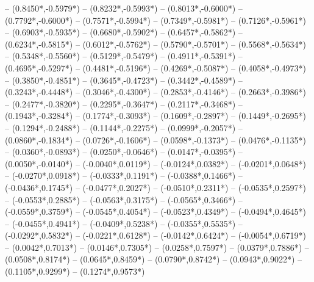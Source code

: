 {	-- ({0.8450*\dx},{-0.5979*\dy})
	-- ({0.8232*\dx},{-0.5993*\dy})
	-- ({0.8013*\dx},{-0.6000*\dy})
	-- ({0.7792*\dx},{-0.6000*\dy})
	-- ({0.7571*\dx},{-0.5994*\dy})
	-- ({0.7349*\dx},{-0.5981*\dy})
	-- ({0.7126*\dx},{-0.5961*\dy})
	-- ({0.6903*\dx},{-0.5935*\dy})
	-- ({0.6680*\dx},{-0.5902*\dy})
	-- ({0.6457*\dx},{-0.5862*\dy})
	-- ({0.6234*\dx},{-0.5815*\dy})
	-- ({0.6012*\dx},{-0.5762*\dy})
	-- ({0.5790*\dx},{-0.5701*\dy})
	-- ({0.5568*\dx},{-0.5634*\dy})
	-- ({0.5348*\dx},{-0.5560*\dy})
	-- ({0.5129*\dx},{-0.5479*\dy})
	-- ({0.4911*\dx},{-0.5391*\dy})
	-- ({0.4695*\dx},{-0.5297*\dy})
	-- ({0.4481*\dx},{-0.5196*\dy})
	-- ({0.4269*\dx},{-0.5087*\dy})
	-- ({0.4058*\dx},{-0.4973*\dy})
	-- ({0.3850*\dx},{-0.4851*\dy})
	-- ({0.3645*\dx},{-0.4723*\dy})
	-- ({0.3442*\dx},{-0.4589*\dy})
	-- ({0.3243*\dx},{-0.4448*\dy})
	-- ({0.3046*\dx},{-0.4300*\dy})
	-- ({0.2853*\dx},{-0.4146*\dy})
	-- ({0.2663*\dx},{-0.3986*\dy})
	-- ({0.2477*\dx},{-0.3820*\dy})
	-- ({0.2295*\dx},{-0.3647*\dy})
	-- ({0.2117*\dx},{-0.3468*\dy})
	-- ({0.1943*\dx},{-0.3284*\dy})
	-- ({0.1774*\dx},{-0.3093*\dy})
	-- ({0.1609*\dx},{-0.2897*\dy})
	-- ({0.1449*\dx},{-0.2695*\dy})
	-- ({0.1294*\dx},{-0.2488*\dy})
	-- ({0.1144*\dx},{-0.2275*\dy})
	-- ({0.0999*\dx},{-0.2057*\dy})
	-- ({0.0860*\dx},{-0.1834*\dy})
	-- ({0.0726*\dx},{-0.1606*\dy})
	-- ({0.0598*\dx},{-0.1373*\dy})
	-- ({0.0476*\dx},{-0.1135*\dy})
	-- ({0.0360*\dx},{-0.0893*\dy})
	-- ({0.0250*\dx},{-0.0646*\dy})
	-- ({0.0147*\dx},{-0.0395*\dy})
	-- ({0.0050*\dx},{-0.0140*\dy})
	-- ({-0.0040*\dx},{0.0119*\dy})
	-- ({-0.0124*\dx},{0.0382*\dy})
	-- ({-0.0201*\dx},{0.0648*\dy})
	-- ({-0.0270*\dx},{0.0918*\dy})
	-- ({-0.0333*\dx},{0.1191*\dy})
	-- ({-0.0388*\dx},{0.1466*\dy})
	-- ({-0.0436*\dx},{0.1745*\dy})
	-- ({-0.0477*\dx},{0.2027*\dy})
	-- ({-0.0510*\dx},{0.2311*\dy})
	-- ({-0.0535*\dx},{0.2597*\dy})
	-- ({-0.0553*\dx},{0.2885*\dy})
	-- ({-0.0563*\dx},{0.3175*\dy})
	-- ({-0.0565*\dx},{0.3466*\dy})
	-- ({-0.0559*\dx},{0.3759*\dy})
	-- ({-0.0545*\dx},{0.4054*\dy})
	-- ({-0.0523*\dx},{0.4349*\dy})
	-- ({-0.0494*\dx},{0.4645*\dy})
	-- ({-0.0455*\dx},{0.4941*\dy})
	-- ({-0.0409*\dx},{0.5238*\dy})
	-- ({-0.0355*\dx},{0.5535*\dy})
	-- ({-0.0292*\dx},{0.5832*\dy})
	-- ({-0.0221*\dx},{0.6128*\dy})
	-- ({-0.0142*\dx},{0.6424*\dy})
	-- ({-0.0054*\dx},{0.6719*\dy})
	-- ({0.0042*\dx},{0.7013*\dy})
	-- ({0.0146*\dx},{0.7305*\dy})
	-- ({0.0258*\dx},{0.7597*\dy})
	-- ({0.0379*\dx},{0.7886*\dy})
	-- ({0.0508*\dx},{0.8174*\dy})
	-- ({0.0645*\dx},{0.8459*\dy})
	-- ({0.0790*\dx},{0.8742*\dy})
	-- ({0.0943*\dx},{0.9022*\dy})
	-- ({0.1105*\dx},{0.9299*\dy})
	-- ({0.1274*\dx},{0.9573*\dy})
}
